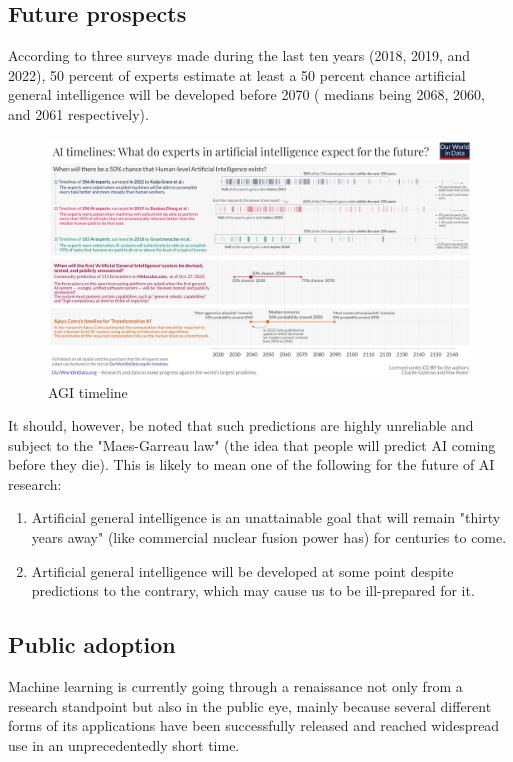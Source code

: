 \documentclass[masterthesis]{fer}
\begin{document}
\subsection{Future prospects}
According to three surveys made during the last ten years (2018, 2019, and 2022),
50 percent of experts estimate at least a 50 percent chance artificial general intelligence will be developed before 2070 ( medians being 2068, 2060, and 2061 respectively).
\cite{owid-ai-timelines}
\begin{figure}[htb]
  \centering
  \includegraphics[width=1\linewidth]{Figures/wen agi.png} 
  \caption{AGI timeline}
  \label{slk:AGI_timeline}
\end{figure}

It should, however, be noted that such predictions are highly unreliable and subject to the "Maes-Garreau law" (the idea that people will predict AI coming before they die).
\cite{stuart_armstrong_2012}
This is likely to mean one of the following for the future of AI research:
\begin{enumerate}
\item{Artificial general intelligence is an unattainable goal that will remain "thirty years away" (like commercial nuclear fusion power has) for centuries to come.}
\item{Artificial general intelligence will be developed at some point despite predictions to the contrary, which may cause us to be ill-prepared for it.}
\end{enumerate}

\subsection{Public adoption}
Machine learning is currently going through a renaissance not only from a research standpoint but also in the public eye, mainly because several different forms of its applications have been successfully released and reached widespread use in an unprecedentedly short time.
\end{document}
